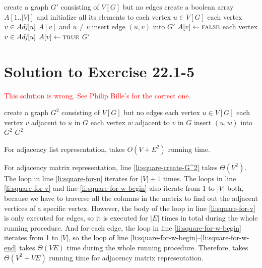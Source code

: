 \documentclass[a4paper, fleqn]{article}
\begin{document}
\begin{codebox}
\li create a graph $G'$ consisting of $V[G]$ but no edges
\li create a boolean array $A[1..|V|]$ and initialize all its elements to 
\li \For each vertex $u \in V[G]$
\li    \Do
         \For each vertex $v \in \id{Adj}[u]$
\li         \Do
              \If $A[v]$ and $u \neq v$
\li             \Then
                  insert edge $(u, v)$ into $G'$
\li               $A[v] \gets \textnormal{\scshape false}$
                \End
            \End
\li      \For each vertex $v \in \id{Adj}[u]$
\li         \Do
              $A[v] \gets \textnormal{\scshape true}$
            \End
      \End
\li \Return $G'$
\end{codebox}


\section*{Solution to Exercise 22.1-5}

\textcolor{red}{This solution is wrong. See Philip Bille's for the correct one.}

\begin{codebox}
\li create a graph $G^2$ consisting of $V[G]$ but no edges \label{li:square-create-G^2}
\li \For each vertex $u \in V[G]$  \label{li:square-for-u}
\li   \Do
        \For each vertex $v$ adjacent to $u$ in $G$  \label{li:square-for-v}
\li       \Do
            \For each vertex $w$ adjacent to $v$ in $G$    \label{li:square-for-w-begin}
\li           \Do
                insert $(u, w)$ into $G^2$    \label{li:square-for-w-end}
              \End
          \End
      \End
\li \Return $G^2$
\end{codebox}

For adjacency list representation,  takes $O(V + E^2)$ running time.

For adjacency matrix representation, line \ref{li:square-create-G^2} takes $\Theta(V^2)$. The \For loop in line \ref{li:square-for-u} iterates for $|V| + 1$ times. The \For loops in line \ref{li:square-for-v} and line \ref{li:square-for-w-begin} also iterate from 1 to $|V|$ both, because we have to traverse all the columns in the matrix to find out the adjacent vertices of a specific vertex. However, the body of the \For loop in line \ref{li:square-for-v} is only executed for edges, so it is executed for $|E|$ times in total during the whole running procedure. And for each edge, the \For loop in line \ref{li:square-for-w-begin} iterates from 1 to $|V|$, so the \For loop of line \ref{li:square-for-w-begin}--\ref{li:square-for-w-end} takes $\Theta(VE)$ time during the whole running procedure. Therefore,  takes $\Theta(V^2 + VE)$ running time for adjacency matrix representation.
\end{document}
